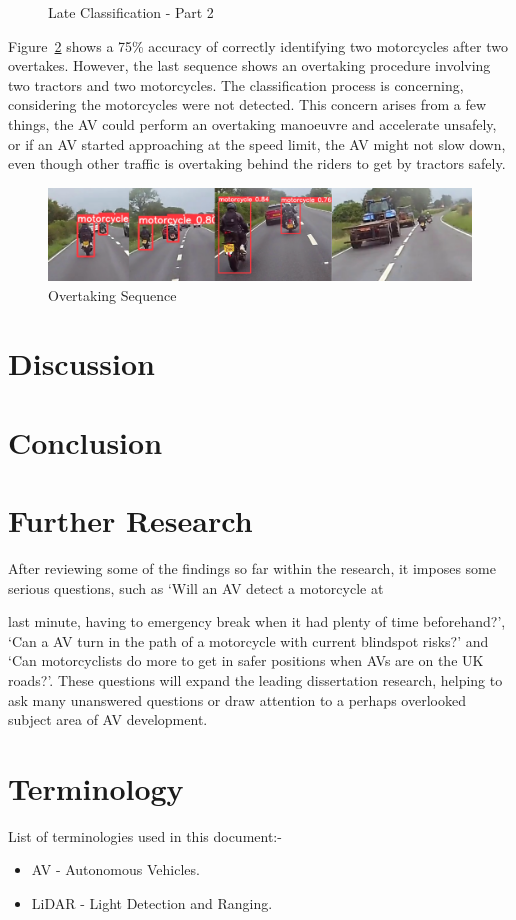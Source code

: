 \documentclass[conference]{IEEEtran}
\begin{document}
\begin{figure}[h]
\begin{minipage}{0.15\textwidth}
			\caption{Late Classification - Part 2}
			\label{fig:lateClassificationP2}
		\end{minipage}
	\end{figure}	

	Figure~\ref{fig:overtakingSequence} shows a 75\% accuracy of correctly identifying two motorcycles after two overtakes. However, the last sequence shows an overtaking procedure involving two tractors and two motorcycles. The classification process is concerning, considering the motorcycles were not detected. This concern arises from a few things, the AV could perform an overtaking manoeuvre and accelerate unsafely, or if an AV started approaching at the speed limit, the AV might not slow down, even though other traffic is overtaking behind the riders to get by tractors safely.
	\begin{figure}[h]
		\centering
		\includegraphics[width=\columnwidth]{Figures/motorcycle_overtaking_sequence.png}
		\caption{Overtaking Sequence}
		\label{fig:overtakingSequence}
	\end{figure}
\section{Discussion}
	
\section{Conclusion}

\section{Further Research}
	After reviewing some of the findings so far within the research, it imposes some serious questions, such as `Will an AV detect a motorcycle at
	
	last minute, having to emergency break when it had plenty of time beforehand?', `Can a AV turn in the path of a motorcycle with current blindspot risks?' and `Can motorcyclists do more to get in safer positions when AVs are on the UK roads?'. These questions will expand the leading dissertation research, helping to ask many unanswered questions or draw attention to a perhaps overlooked subject area of AV development.

\section{Terminology}
	List of terminologies used in this document:-
	\begin{itemize}
		\item AV - Autonomous Vehicles.
		\item LiDAR - Light Detection and Ranging.
	\end{itemize}

\nocite{*}
\renewcommand\refname{\section{Reference List}}
\small{
	}
\end{document}
